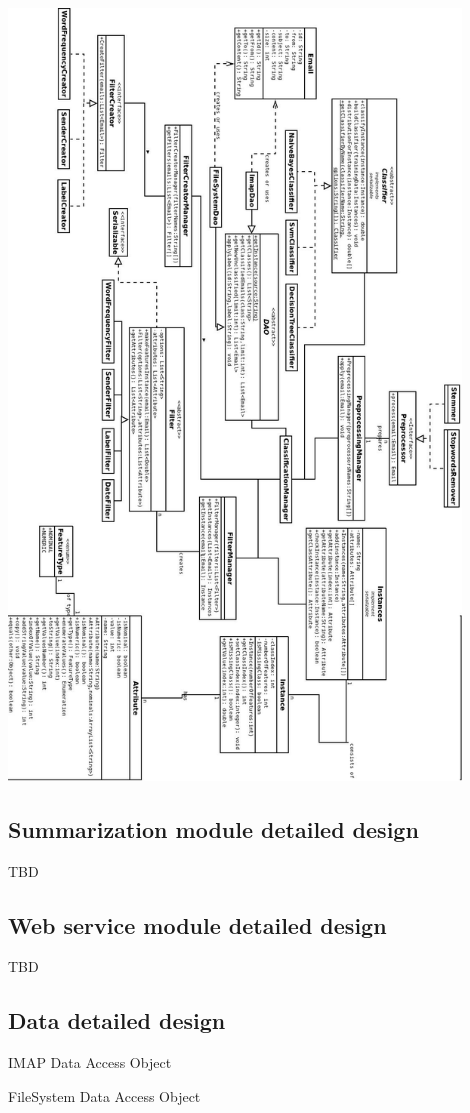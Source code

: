 \documentclass[12pt]{article}
\newenvironment{my_itemize}
{\begin{itemize}
  \setlength{\itemsep}{0cm}
  \setlength{\parskip}{0cm}}
{\end{itemize}}
\begin{document}
\includegraphics[width=12cm]{design.jpeg}\\



\subsection{Summarization module detailed design}
TBD

\subsection{Web service module detailed design}
TBD

\subsection{Data detailed design}

\begin{my_itemize}
  \item IMAP Data Access Object
  \item FileSystem Data Access Object
\end{my_itemize}
\end{document}
